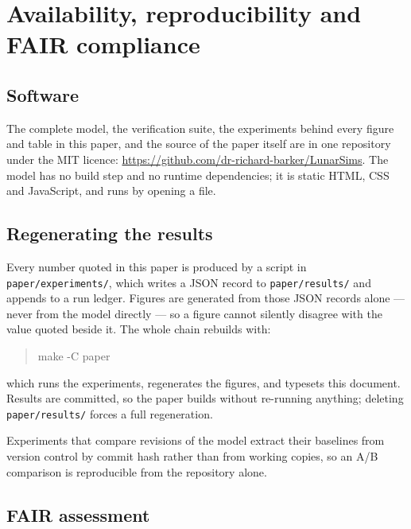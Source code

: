 \section{Availability, reproducibility and FAIR compliance}
\label{sec:fair}

\subsection{Software}

The complete model, the verification suite, the experiments behind every figure
and table in this paper, and the source of the paper itself are in one
repository under the MIT licence:
\url{https://github.com/dr-richard-barker/LunarSims}. The model has no build
step and no runtime dependencies; it is static HTML, CSS and JavaScript, and
runs by opening a file.

\subsection{Regenerating the results}

Every number quoted in this paper is produced by a script in
\texttt{paper/experiments/}, which writes a JSON record to
\texttt{paper/results/} and appends to a run ledger. Figures are generated from
those JSON records alone --- never from the model directly --- so a figure
cannot silently disagree with the value quoted beside it. The whole chain
rebuilds with:

\begin{quote}\ttfamily
make -C paper
\end{quote}

which runs the experiments, regenerates the figures, and typesets this
document. Results are committed, so the paper builds without re-running
anything; deleting \texttt{paper/results/} forces a full regeneration.

Experiments that compare revisions of the model extract their baselines from
version control by commit hash rather than from working copies, so an A/B
comparison is reproducible from the repository alone.

\subsection{FAIR assessment}

